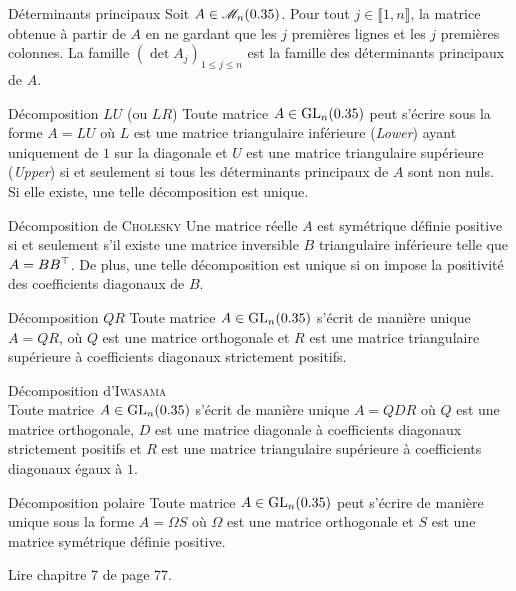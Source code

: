 \begin{defi}{Déterminants principaux}
    Soit $A \in \mathscr{M}_n(0.35)$. Pour tout $j \in \llbracket 1, n \rrbracket$, la matrice obtenue à partir de $A$ en ne gardant que les $j$ premières lignes et les $j$ premières colonnes. La famille $(\det A_j)_{1 \leqslant j \leqslant n}$ est la famille des déterminants principaux de $A$.
\end{defi}


\begin{theo}{Décomposition $LU$ (ou $LR$)}
    Toute matrice $A \in \mathrm{GL}_n(0.35)$ peut s'écrire sous la forme $A = LU$ où $L$ est une matrice triangulaire inférieure (\emph{Lower}) ayant uniquement de $1$ sur la diagonale et $U$ est une matrice triangulaire supérieure (\emph{Upper}) si et seulement si tous les déterminants principaux de $A$ sont non nuls. \\
    Si elle existe, une telle décomposition est unique.
\end{theo}

\begin{theo}{Décomposition de \textsc{Cholesky}}
    Une matrice réelle $A$ est symétrique définie positive si et seulement s'il existe une matrice inversible $B$ triangulaire inférieure telle que $A = B B^\top$. De plus, une telle décomposition est unique si on impose la positivité des coefficients diagonaux de $B$.  
\end{theo}  

\begin{theo}{Décomposition $QR$}
    Toute matrice $A \in \mathrm{GL}_n(0.35)$ s'écrit de manière unique $A = QR$, où $Q$ est une matrice orthogonale et $R$ est une matrice triangulaire supérieure à coefficients diagonaux strictement positifs. 
\end{theo}

\begin{corol}
    Décomposition d'\textsc{Iwasama} \\
    Toute matrice $A \in \mathrm{GL}_n(0.35)$ s'écrit de manière unique $A = QDR$ où $Q$ est une matrice orthogonale, $D$ est une matrice diagonale à coefficients diagonaux strictement positifs et $R$ est une matrice triangulaire supérieure à coefficients diagonaux égaux à $1$. 
\end{corol}

\begin{theo}{Décomposition polaire}
    Toute matrice $A \in \mathrm{GL}_n(0.35)$ peut s'écrire de manière unique sous la forme $A = \Omega S$ où $\Omega$ est une matrice orthogonale et $S$ est une matrice symétrique définie positive. 
\end{theo}
Lire chapitre 7 de \cite{matrices} page 77.


